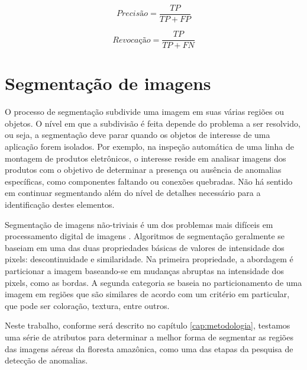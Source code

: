 \begin{equation}
  Precisão = \frac{TP}{TP+FP}
\label{eq:precisao}
\end{equation}


\begin{equation}
  Revocação = \frac{TP}{TP+FN}
\label{eq:revocacao}
\end{equation}

\section{Segmentação de imagens}

O processo de segmentação subdivide uma imagem em suas várias regiões ou objetos. O nível em que a subdivisão é feita depende do problema a ser resolvido, ou seja, a segmentação deve parar quando os objetos de interesse de uma aplicação forem isolados. Por exemplo, na inspeção automática de uma linha de montagem de produtos eletrônicos, o interesse reside em analisar imagens dos produtos com o objetivo de determinar a presença ou ausência de anomalias específicas, como componentes faltando ou conexões quebradas. Não há sentido em continuar segmentando além do nível de detalhes necessário para a identificação destes elementos.

Segmentação de imagens não-triviais é um dos problemas mais difíceis em processamento digital de imagens \cite{gonzalez:2002}. Algoritmos de segmentação geralmente se baseiam em uma das duas propriedades básicas de valores de intensidade dos pixels: descontinuidade e similaridade. Na primeira propriedade, a abordagem é particionar a imagem baseando-se em mudanças abruptas na intensidade dos pixels, como as bordas. A segunda categoria se baseia no particionamento de uma imagem em regiões que são similares de acordo com um critério em particular, que pode ser coloração, textura, entre outros.

Neste trabalho, conforme será descrito no capítulo \ref{cap:metodologia}, testamos uma série de atributos para determinar a melhor forma de segmentar as regiões das imagens aéreas da floresta amazônica, como uma das etapas da pesquisa de detecção de anomalias.
